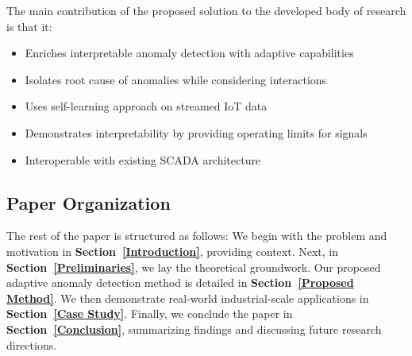The main contribution of the proposed solution to the developed body of research is that it:
\begin{itemize}
\item Enriches interpretable anomaly detection with adaptive capabilities
\item Isolates root cause of anomalies while considering interactions
\item Uses self-learning approach on streamed IoT data
\item Demonstrates interpretability by providing operating limits for signals
\item Interoperable with existing SCADA architecture
\end{itemize}

\subsection{Paper Organization}
The rest of the paper is structured as follows: We begin with the problem and motivation in \textbf{Section~\ref{Introduction}}, providing context. Next, in \textbf{Section~\ref{Preliminaries}}, we lay the theoretical groundwork. Our proposed adaptive anomaly detection method is detailed in \textbf{Section~\ref{Proposed Method}}. We then demonstrate real-world industrial-scale applications in \textbf{Section~\ref{Case Study}}. Finally, we conclude the paper in \textbf{Section~\ref{Conclusion}}, summarizing findings and discussing future research directions.
